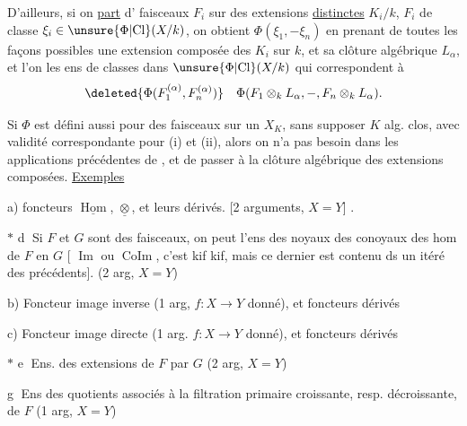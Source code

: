 D'ailleurs, si on \uline{part} d' faisceaux  $F_i$ sur des extensions \uline{distinctes} $K_i/k$, $F_i$ de classe $\xi_i\in\unsure{\Phi|\mathrm{Cl}}(X/k)$, on obtient $\Phi(\xi_1,-\xi_n)$ en prenant de toutes les façons possibles une extension composée des $K_i$ sur $k$, et sa clôture algébrique  $L_\alpha$, et l'on  les ens de classes dans $\unsure{\Phi|\mathrm{Cl}}(X/k)$ qui correspondent à
\[
\deleted{\Phi(F_1^{(\alpha)},F_n^{(\alpha)})}\quad
\Phi(F_1\otimes_kL_\alpha,-,F_n\otimes_kL_\alpha).
\]

Si $\Phi$ est défini aussi pour des faisceaux sur un $X_K$, sans supposer $K$ alg. clos, avec validité correspondante pour (i) et (ii), alors on n'a pas besoin dans les applications précédentes de , et de passer à la clôture algébrique des extensions composées.
\uline{Exemples}

a) foncteurs $\underline{\operatorname{Hom}}$, $\underline{\otimes}$, et leurs dérivés. [2 arguments, $X=Y$] .

$*$ \textcircled{d} Si $F$ et $G$ sont des faisceaux, on peut  l'ens  des noyaux  des conoyaux des hom de $F$ en $G$ [ $\operatorname{Im}$ ou $\operatorname{CoIm}$, c'est kif kif, mais ce dernier est contenu ds un itéré des précédents]. (2 arg, $X=Y$)


b) Foncteur image inverse (1 arg, $f:X\to Y$ donné), et foncteurs dérivés

c) Foncteur image directe (1 arg. $f:X\to Y$  donné), et foncteurs dérivés

$*$ \textcircled{e} Ens. des extensions de $F$ par $G$ (2 arg, $X=Y$)

\textcircled{g} Ens des quotients associés à la filtration primaire croissante, resp. décroissante, de $F$ (1 arg, $X=Y$)

